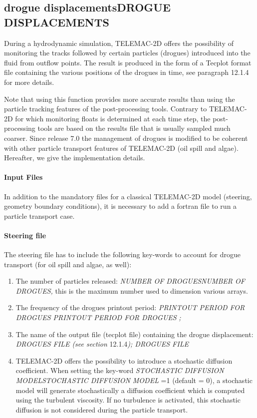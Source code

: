 \documentclass{article} %
\begin{document}
\subsection{ drogue displacementsDROGUE DISPLACEMENTS}

 During a hydrodynamic simulation, TELEMAC-2D offers the possibility of monitoring the tracks followed by certain particles (drogues) introduced into the fluid from outflow points. The result is produced in the form of a Tecplot format file containing the various positions of the drogues in time, see paragraph 12.1.4 for more details.

 Note that using this function provides more accurate results than using the particle tracking features of the post-processing tools. Contrary to TELEMAC-2D for which monitoring floats is determined at each time step, the post-processing tools are based on the results file that is usually sampled much coarser. Since release 7.0 the management of drogues is modified to be coherent with other particle transport features of TELEMAC-2D (oil spill and algae). Hereafter, we give the implementation details.


\paragraph{ Input Files}

 In addition to the mandatory files for a classical TELEMAC-2D model (steering, geometry boundary conditions), it is necessary to add a fortran file to run a particle transport case.


\paragraph{ Steering file}

 The steering file has to include the following key-words to account for drogue transport (for oil spill and algae, as well):

\begin{enumerate}
\item  The number of particles released: \textit{NUMBER OF DROGUESNUMBER OF DROGUES, }this is the maximum number used to dimension various arrays.

\item  The frequency of the drogues printout period: \textit{PRINTOUT PERIOD FOR DROGUES PRINTOUT PERIOD FOR DROGUES} \textit{;}

\item  The name of the output file (tecplot file) containing the drogue displacement: \textit{DROGUES FILE (see section }12.1.4\textit{); DROGUES FILE} \textit{ }

\item  TELEMAC-2D offers the possibility to introduce a stochastic diffusion coefficient. When setting the key-word \textit{STOCHASTIC DIFFUSION MODELSTOCHASTIC DIFFUSION MODEL} =1 (default = 0), a stochastic model will generate stochastically a diffusion coefficient which is computed using the turbulent viscosity. If no turbulence is activated, this stochastic diffusion is not considered during the particle transport.
\end{enumerate}
\end{document}
